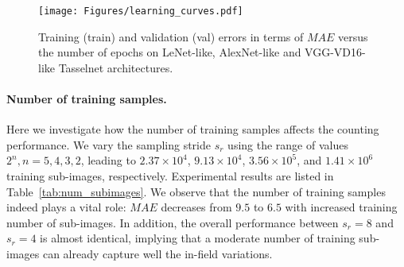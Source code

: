 \documentclass[twocolumn]{bmcart}%
\begin{document}
\begin{figure}[!t]
	\centering
	\texttt{[image: Figures/learning\_curves.pdf]}
	\caption{Training (train) and validation (val) errors in terms of $MAE$ versus the number of epochs on LeNet-like, AlexNet-like and VGG-VD16-like Tasselnet architectures.}
	\label{fig:learning_curves}
\end{figure}

\paragraph{Number of training samples.} Here we investigate how the number of training samples affects the counting performance. We vary the sampling stride $s_r$ using the range of values $2^n, n=5, 4, 3, 2$, leading to $2.37\times10^4$, $9.13\times10^4$, $3.56\times10^5$, and $1.41\times10^6$ training sub-images, respectively. Experimental results are listed in Table~\ref{tab:num_subimages}. We observe that the number of training samples indeed plays a vital role: $MAE$ decreases from $9.5$ to $6.5$ with increased training number of sub-images. In addition, the overall performance between $s_r=8$ and $s_r=4$ is almost identical, implying that a moderate number of training sub-images can already capture well the in-field variations.
\end{document}
